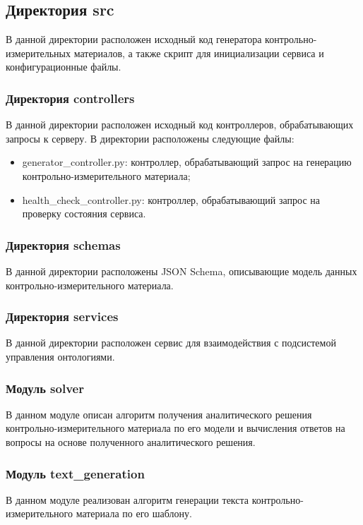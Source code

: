 \documentclass[a4paper,12pt]{article}
\begin{document}
    \subsection{Директория src}
    В данной директории расположен исходный код генератора контрольно-измерительных материалов, а также скрипт для инициализации сервиса и конфигурационные файлы.

    \subsubsection{Директория controllers}
    В данной директории расположен исходный код контроллеров, обрабатывающих запросы к серверу. В директории расположены следующие файлы:
    \begin{itemize}
        \item generator\_controller.py: контроллер, обрабатывающий запрос на генерацию контрольно-измерительного материала;
        \item health\_check\_controller.py: контроллер, обрабатывающий запрос на проверку состояния сервиса.
    \end{itemize}

    \subsubsection{Директория schemas}
    В данной директории расположены JSON\cite{Format:JSON} Schema, описывающие модель данных контрольно-измерительного материала.

    \subsubsection{Директория services}
    В данной директории расположен сервис для взаимодействия с подсистемой управления онтологиями.

    \subsubsection{Модуль solver}
    В данном модуле описан алгоритм получения аналитического решения контрольно-измерительного материала по его модели и вычисления ответов на вопросы на основе полученного аналитического решения.

    \subsubsection{Модуль text_generation}
    В данном модуле реализован алгоритм генерации текста контрольно-измерительного материала по его шаблону.
\end{document}
